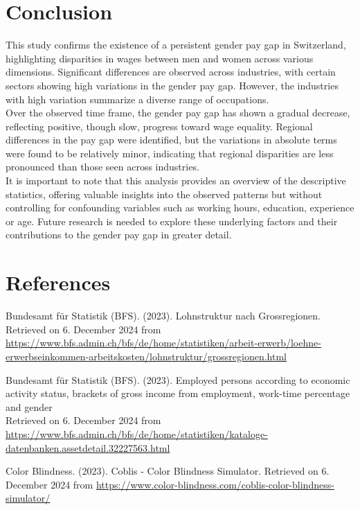 \documentclass{article}
\begin{document}
\clearpage
\section{Conclusion}

This study confirms the existence of a persistent gender pay gap in Switzerland, highlighting disparities in wages between men and women across various dimensions. Significant differences are observed across industries, with certain sectors showing high variations in the gender pay gap. However, the industries with high variation summarize a diverse range of occupations. \\

Over the observed time frame, the gender pay gap has shown a gradual decrease, reflecting positive, though slow, progress toward wage equality. Regional differences in the pay gap were identified, but the variations in absolute terms were found to be relatively minor, indicating that regional disparities are less pronounced than those seen across industries. \\

It is important to note that this analysis provides an overview of the descriptive statistics, offering valuable insights into the observed patterns but without controlling for confounding variables such as working hours, education, experience or age. Future research is needed to explore these underlying factors and their contributions to the gender pay gap in greater detail.


\newpage  %
\section{References}


\begin{thebibliography}{9} %

 Bundesamt für Statistik (BFS). (2023). Lohnstruktur nach Grossregionen. \\
Retrieved on 6. December 2024 from  \url{https://www.bfs.admin.ch/bfs/de/home/statistiken/arbeit-erwerb/loehne-erwerbseinkommen-arbeitskosten/lohnstruktur/grossregionen.html}

 Bundesamt für Statistik (BFS). (2023). Employed persons according to economic activity status, brackets of gross income from employment, work-time percentage and gender \\
Retrieved on 6. December 2024 from \url{https://www.bfs.admin.ch/bfs/de/home/statistiken/kataloge-datenbanken.assetdetail.32227563.html}

 Color Blindness. (2023). Coblis - Color Blindness Simulator. Retrieved on 6. December 2024 from \url{https://www.color-blindness.com/coblis-color-blindness-simulator/}

\end{thebibliography}
\end{document}
